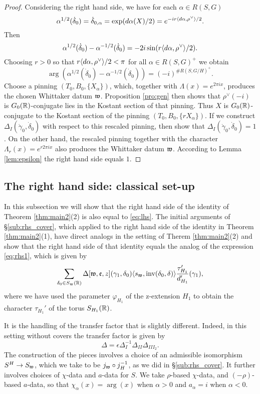 \documentclass{article}
\theoremstyle{definition}
\numberwithin{equation}{section}
\renewcommand{\-}{\hyp{}}
\begin{document}
\begin{proof}
Considering the right hand side, we have for each $\alpha \in R(S,G)$
\[ \alpha^{1/2}(\dot\delta_0)=\dot\delta_{0,\alpha} = \exp(d\alpha(X)/2)=e^{-ir\langle d\alpha,\rho^\vee\rangle/2}.\]
Then
\[ \alpha^{1/2}(\dot\delta_0)-\alpha^{-1/2}(\dot\delta_0) = -2i\sin(r\langle d\alpha,\rho^\vee\rangle/2). \]
Choosing $r>0$ so that $r\langle d\alpha,\rho^\vee\rangle/2 < \pi$ for all $\alpha \in R(S,G)^+$ we obtain
\[ \arg(\alpha^{1/2}(\dot\delta_0) - \alpha^{-1/2}(\dot\delta_0)) = (-i)^{\#R(S,G/H)^+}. \]
Choose a pinning $(T_0,B_0,\{X_\alpha\})$, which, together with $\Lambda(x)=e^{2\pi ix}$, produces the chosen Whittaker datum $\mathfrak{w}$. Proposition \ref{pro:gen} then shows that $\rho^\vee(-i)$ is $G_0(\mathbb{R})$-conjugate lies in the Kostant section of that pinning. Thus $X$ is $G_0(\mathbb{R})$-conjugate to the Kostant section of the pinning $(T_0,B_0,\{rX_\alpha\})$. If we construct $\Delta_I(\dot\gamma_0,\dot\delta_0)$ with respect to this rescaled pinning, then \cite[Lemma 4.1.4]{KalHDC} show that $\Delta_I(\dot\gamma_0,\dot\delta_0)=1$. On the other hand, the rescaled pinning together with the character $\Lambda_r(x)=e^{r2\pi i x}$ also produces the Whittaker datum $\mathfrak{w}$. According to Lemma \ref{lem:epsilon} the right hand side equals $1$.
\end{proof}

\subsection{The right hand side: classical set-up}

In this subsection we will show that the right hand side of the identity of Theorem \ref{thm:main2}(2) is also equal to \eqref{eq:lhs}. The initial arguments of \S\ref{sub:rhs_cover}, which applied to the right hand side of the identity in Theorem \ref{thm:main2}(1), have direct analogs in the setting of Therem \ref{thm:main2}(2) and show that the right hand side of that identity equals the analog of the expression \eqref{eq:rhs1}, which is given by
\begin{equation} \label{eq:rhs2}
\sum_{\delta_0 \in S_{\mathfrak{w}}(\mathbb{R})} \Delta[\mathfrak{w},\mathfrak{e},z](\gamma_1,\delta_0)\langle s_{\mathfrak{w}},\textrm{inv}(\delta_0,\delta)\rangle \frac{\tau'_{H_1}}{d'_{H_1}}(\gamma_1),	
\end{equation}
where we have used the parameter $\varphi_{H_1}$ of the z-extension $H_1$ to obtain the character $\tau_{H_1}'$ of the torus $S_{H_1}(\mathbb{R})$.


It is the handling of the transfer factor that is slightly different. Indeed, in this setting without covers the transfer factor is given by
\[ \Delta = \epsilon\Delta_I^{-1}\Delta_{II}\Delta_{III_2}. \]
The construction of the pieces involves a choice of an admissible isomorphism $S^H \to S_{\mathfrak{w}}$, which we take to be $j_{\mathfrak{w}}\circ j_H^{-1}$, as we did in \S\ref{sub:rhs_cover}. It further involves choices of $\chi$-data and $a$-data for $S$. We take $\rho$-based $\chi$-data, and $(-\rho)$-based $a$-data, so that $\chi_\alpha(x)=\arg(x)$ when $\alpha>0$ and $a_\alpha=i$ when $\alpha<0$.
\end{document}

